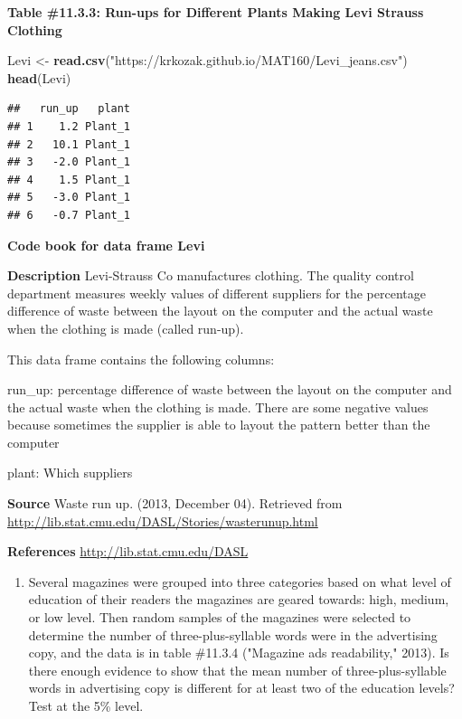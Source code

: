 \documentclass[]{book}
\newenvironment{Shaded}{\begin{snugshade}}{\end{snugshade}}
\newcommand{\KeywordTok}[1]{\textcolor[rgb]{0.13,0.29,0.53}{\textbf{#1}}}
\newcommand{\NormalTok}[1]{#1}
\newcommand{\StringTok}[1]{\textcolor[rgb]{0.31,0.60,0.02}{#1}}
\providecommand{\tightlist}{%
  \setlength{\itemsep}{0pt}\setlength{\parskip}{0pt}}
\begin{document}
\textbf{Table \#11.3.3: Run-ups for Different Plants Making Levi Strauss Clothing}

\begin{Shaded}
\begin{Highlighting}[]
\NormalTok{Levi <-}\StringTok{ }\KeywordTok{read.csv}\NormalTok{(}\StringTok{"https://krkozak.github.io/MAT160/Levi_jeans.csv"}\NormalTok{)}
\KeywordTok{head}\NormalTok{(Levi)}
\end{Highlighting}
\end{Shaded}

\begin{verbatim}
##   run_up   plant
## 1    1.2 Plant_1
## 2   10.1 Plant_1
## 3   -2.0 Plant_1
## 4    1.5 Plant_1
## 5   -3.0 Plant_1
## 6   -0.7 Plant_1
\end{verbatim}

\textbf{Code book for data frame Levi}

\textbf{Description}
Levi-Strauss Co manufactures clothing. The quality control department measures weekly values of different suppliers for the percentage difference of waste between the layout on the computer and the actual waste when the clothing is made (called run-up).

This data frame contains the following columns:

run\_up: percentage difference of waste between the layout on the computer and the actual waste when the clothing is made. There are some negative values because sometimes the supplier is able to layout the pattern better than the computer

plant: Which suppliers

\textbf{Source}
Waste run up. (2013, December 04). Retrieved from \url{http://lib.stat.cmu.edu/DASL/Stories/wasterunup.html}

\textbf{References}
\url{http://lib.stat.cmu.edu/DASL}

\begin{enumerate}
\def\labelenumi{\arabic{enumi}.}
\setcounter{enumi}{2}
\tightlist
\item
  Several magazines were grouped into three categories based on what level of education of their readers the magazines are geared towards: high, medium, or low level. Then random samples of the magazines were selected to determine the number of three-plus-syllable words were in the advertising copy, and the data is in table \#11.3.4 ("Magazine ads readability," 2013). Is there enough evidence to show that the mean number of three-plus-syllable words in advertising copy is different for at least two of the education levels? Test at the 5\% level.
\end{enumerate}
\end{document}
